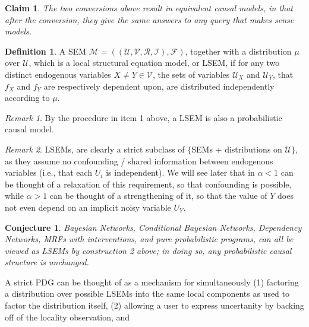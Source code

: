 \documentclass{article}
\theoremstyle{plain}
\newtheorem{claim}[theorem]{Claim}
\newtheorem{conj}[theorem]{Conjecture}
\theoremstyle{definition}
\newtheorem{defn}{Definition}
\theoremstyle{remark}
\newtheorem*{remark}{Remark}
\begin{document}
\begin{claim}
	The two conversions above result in equivalent causal models, in that after the conversion, they give the same answers to any query that makes sense models.
\end{claim}


\begin{defn}
	A SEM $\mathcal M = ((\mathcal U, \mathcal V, \mathcal R, \mathcal I), \mathcal F)$, together with a 	distribution $\mu$ over $\mathcal U$, which is a local structural equation model, or LSEM, if for any two distinct endogenous variables $X \neq Y \in \mathcal V$, the sets of variables $\mathcal U_X$ and $\mathcal U_Y$, that $f_X$ and $f_Y$ are respectively dependent upon, are distributed independently according to $\mu$.
\end{defn}
\begin{remark}
	By the procedure in item 1 above, a LSEM is also a probabilistic causal model.
\end{remark}

\begin{remark}
	LSEMs, are clearly a strict subclass of $\{$SEMs + distributions on $\mathcal U\}$, as they assume no confounding / shared information between endogenous variables (i.e., that each $U_i$ is independent). 
	We will see later that in $\alpha < 1$ can be thought of a relaxation of this requirement, so that confounding is possible, while $\alpha > 1$ can be thought of a strengthening of it, so that the value of $Y$ does not even depend on an implicit noisy variable $U_Y$.
\end{remark}

\begin{conj}
	Bayesian Networks, Conditional Bayesian Networks, Dependency Networks, MRFs with interventions, and pure probabilistic programs, can all be viewed as LSEMs by construction 2 above; in doing so, any probabilistic causal structure is unchanged.
\end{conj}
A strict PDG can be thought of as a mechanism for simultaneously (1) factoring a distribution over possible LSEMs into the same local components as used to factor the distribution itself, (2) allowing a user to express uncertanity by backing off of the locality observation, and 
\end{document}
